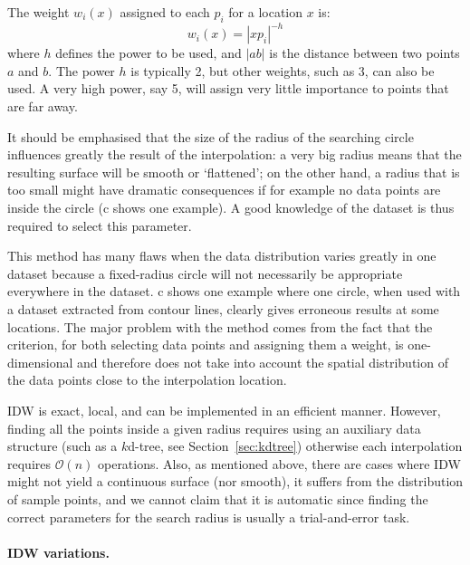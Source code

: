The weight $w_i(x)$ assigned to each $p_i$ for a location $x$ is:
\begin{equation}
w_i(x) = |xp_i|^{-h}
\end{equation}
where $h$ defines the power to be used, and $|ab|$ is the distance between two points $a$ and $b$.
The power $h$ is typically 2,%
but other weights, such as 3, can also be used.
A very high power, say 5, will assign very little importance to points that are far away.

It should be emphasised that the size of the radius of the searching circle influences greatly the result of the interpolation: a very big radius means that the resulting surface will be smooth or `flattened'; on the other hand, a radius that is too small might have dramatic consequences if for example no data points are inside the circle (c shows one example).
A good knowledge of the dataset is thus required to select this parameter. 

This method has many flaws when the data distribution varies greatly in one dataset because a fixed-radius circle will not necessarily be appropriate everywhere in the data\-set. 
c shows one example where one circle, when used with a dataset extracted from contour lines, clearly gives erroneous results at some locations. 
The major problem with the method comes from the fact that the criterion, for both selecting data points and assigning them a weight, is one-dimensional and therefore does not take into account the spatial distribution of the data points close to the interpolation location.

IDW is exact, local, and can be implemented in an efficient manner.
However, finding all the points inside a given radius requires using an auxiliary data structure (such as a $k$d-tree, see Section~\ref{sec:kdtree}) otherwise each interpolation requires $\mathcal{O}(n)$ operations.
Also, as mentioned above, there are cases where IDW might not yield a continuous surface (nor smooth), it suffers from the distribution of sample points, and we cannot claim that it is automatic since finding the correct parameters for the search radius is usually a trial-and-error task.


\paragraph{IDW variations.}

